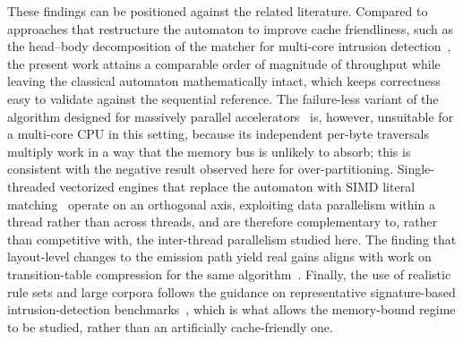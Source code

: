 These findings can be positioned against the related literature. Compared to
approaches that restructure the automaton to improve cache friendliness,
such as the head--body decomposition of the matcher for multi-core intrusion
detection~\cite{LeeYang2017FHBM}, the present work attains a comparable order of
magnitude of throughput while leaving the classical automaton mathematically
intact, which keeps correctness easy to validate against the sequential
reference. The failure-less variant of the algorithm designed for massively
parallel accelerators~\cite{Vajira2018} is, however, unsuitable for a
multi-core CPU in this setting, because its independent per-byte traversals
multiply work in a way that the memory bus is unlikely to absorb; this is
consistent with the negative result observed here for over-partitioning.
Single-threaded vectorized engines
that replace the automaton with SIMD literal matching~\cite{Xu2023Harry} operate
on an orthogonal axis, exploiting data parallelism within a thread rather than
across threads, and are therefore complementary to, rather than competitive with, the inter-thread parallelism studied here. The finding that
layout-level changes to the emission path yield real gains aligns with work on
transition-table compression for the same algorithm~\cite{Regeciova2021MYARA}.
Finally, the use of realistic rule sets and large corpora follows the guidance on
representative signature-based intrusion-detection benchmarks~\cite{Aldwairi2018Characterizing},
which is what allows the memory-bound regime to be studied, rather than an artificially
cache-friendly one.
